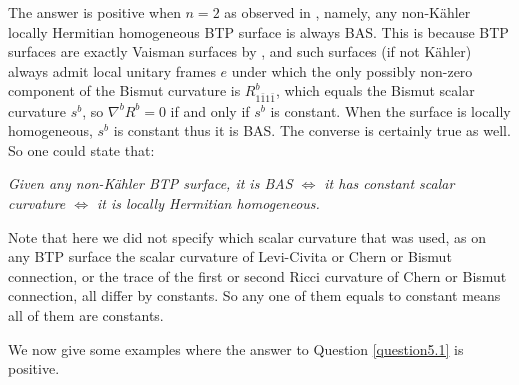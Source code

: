 \documentclass{amsart}
\numberwithin{equation}{section}
\theoremstyle{definition}
\renewcommand{\1}{\mathds{1}}
\renewcommand{\>}{\rightarrow}
\begin{document}
The answer is positive when $n=2$ as observed in \cite{NiZheng}, namely, any non-K\"ahler locally Hermitian homogeneous {\rm BTP} surface is always {\rm BAS}. This is because {\rm BTP} surfaces are exactly Vaisman surfaces by \cite[Theorem 2]{ZhaoZ19Str}, and such surfaces (if not K\"ahler) always admit local unitary frames $e$ under which the only possibly non-zero component of the Bismut curvature is $R^b_{1\bar{1}1\bar{1}}$, which equals the Bismut scalar curvature $s^b$, so $\nabla^bR^b=0$ if and only if $s^b$ is constant. When the surface is locally homogeneous, $s^b$ is constant thus it is {\rm BAS}. The converse is certainly true as well. So one could state that:

{\em Given any non-K\"ahler {\rm BTP} surface, it is {\rm BAS} $\Longleftrightarrow$  it has constant scalar curvature $\Longleftrightarrow$ it is locally Hermitian homogeneous.}

Note that here we did not specify which scalar curvature that was used, as on any {\rm BTP} surface the scalar curvature of Levi-Civita or Chern or Bismut connection, or the trace of the first or second Ricci curvature of Chern or Bismut connection, all differ by constants. So any one of them equals to constant means all of them are constants.

 We now give some examples where the answer to Question \ref{question5.1} is positive.
\end{document}
